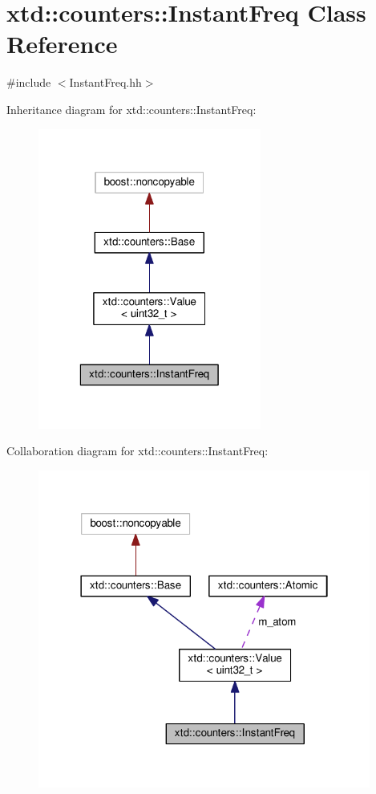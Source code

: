 \hypertarget{classxtd_1_1counters_1_1InstantFreq}{\section{xtd\-:\-:counters\-:\-:Instant\-Freq Class Reference}
\label{classxtd_1_1counters_1_1InstantFreq}
}


{\ttfamily \#include $<$Instant\-Freq.\-hh$>$}



Inheritance diagram for xtd\-:\-:counters\-:\-:Instant\-Freq\-:
\nopagebreak
\begin{figure}[H]
\begin{center}
\leavevmode
\includegraphics[width=208pt]{classxtd_1_1counters_1_1InstantFreq__inherit__graph}
\end{center}
\end{figure}


Collaboration diagram for xtd\-:\-:counters\-:\-:Instant\-Freq\-:
\nopagebreak
\begin{figure}[H]
\begin{center}
\leavevmode
\includegraphics[width=310pt]{classxtd_1_1counters_1_1InstantFreq__coll__graph}
\end{center}
\end{figure}
